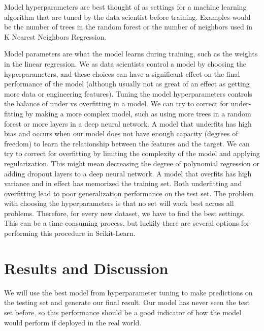 \documentclass{article}
\begin{document}
Model hyperparameters are best thought of as settings for a machine learning algorithm that are tuned by the data scientist before training. Examples would be the number of trees in the random forest or the number of neighbors used in K Nearest Neighbors Regression.

Model parameters are what the model learns during training, such as the weights in the linear regression. We as data scientists control a model by choosing the hyperparameters, and these choices can have a significant effect on the final performance of the model (although usually not as great of an effect as getting more data or engineering features). Tuning the model hyperparameters controls the balance of under vs overfitting in a model. We can try to correct for under-fitting by making a more complex model, such as using more trees in a random forest or more layers in a deep neural network. A model that underfits has high bias and occurs when our model does not have enough capacity (degrees of freedom) to learn the relationship between the features and the target. We can try to correct for overfitting by limiting the complexity of the model and applying regularization. This might mean decreasing the degree of polynomial regression or adding dropout layers to a deep neural network. A model that overfits has high variance and in effect has memorized the training set. Both underfitting and overfitting lead to poor generalization performance on the test set.
The problem with choosing the hyperparameters is that no set will work best across all problems. Therefore, for every new dataset, we have to find the best settings. This can be a time-consuming process, but luckily there are several options for performing this procedure in Scikit-Learn.


\section*{Results and Discussion}
We will use the best model from hyperparameter tuning to make predictions on the testing set and generate our final result. Our model has never seen the test set before, so this performance should be a good indicator of how the model would perform if deployed in the real world.
\end{document}
